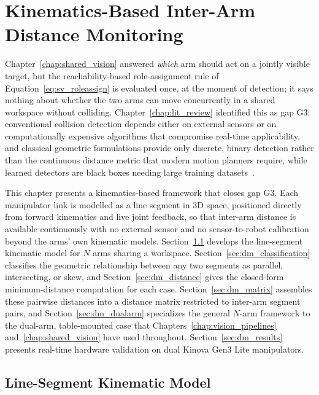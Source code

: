 \chapter{Kinematics-Based Inter-Arm Distance Monitoring}
\label{chap:distance}

Chapter~\ref{chap:shared_vision} answered \emph{which} arm should act on a jointly visible target,
but the reachability-based role-assignment rule of Equation~\eqref{eq:sv_roleassign} is evaluated
once, at the moment of detection; it says nothing about whether the two arms can move concurrently
in a shared workspace without colliding. Chapter~\ref{chap:lit_review} identified this as gap G3:
conventional collision detection depends either on external sensors or on computationally expensive
algorithms that compromise real-time applicability, and classical geometric formulations provide
only discrete, binary detection rather than the continuous distance metric that modern motion
planners require, while learned detectors are black boxes needing large training
datasets~\citep{sk2025distance,surya2025iapf}.

This chapter presents a kinematics-based framework that closes gap G3. Each manipulator link is
modelled as a line segment in 3D space, positioned directly from forward kinematics and live joint
feedback, so that inter-arm distance is available continuously with no external sensor and no
sensor-to-robot calibration beyond the arms' own kinematic models. Section~\ref{sec:dm_model}
develops the line-segment kinematic model for $N$ arms sharing a workspace.
Section~\ref{sec:dm_classification} classifies the geometric relationship between any two segments
as parallel, intersecting, or skew, and Section~\ref{sec:dm_distance} gives the closed-form
minimum-distance computation for each case. Section~\ref{sec:dm_matrix} assembles these pairwise
distances into a distance matrix restricted to inter-arm segment pairs, and
Section~\ref{sec:dm_dualarm} specializes the general $N$-arm framework to the dual-arm, table-mounted
case that Chapters~\ref{chap:vision_pipelines} and~\ref{chap:shared_vision} have used throughout.
Section~\ref{sec:dm_results} presents real-time hardware validation on dual Kinova Gen3 Lite
manipulators.

\section{Line-Segment Kinematic Model}\label{sec:dm_model}

